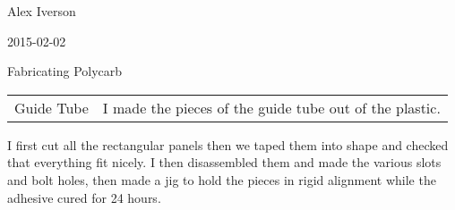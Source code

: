 Alex Iverson

2015-02-02

Fabricating Polycarb

\begin{tabular}{|p{5cm}|p{5cm}|}
 Guide Tube& I made the pieces of the guide tube out of the plastic.
\end{tabular}

I first cut all the rectangular panels then we taped them into shape and checked that everything fit nicely. I then disassembled them and made the various slots and bolt holes, then made a jig to hold the pieces in rigid alignment while the adhesive cured for 24 hours. 

